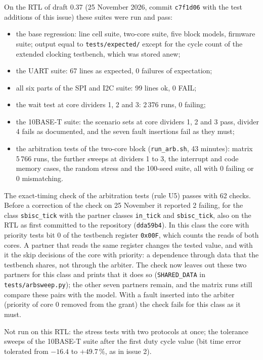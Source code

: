 \documentclass[10pt,a4paper]{article}
\begin{document}
On the RTL of draft 0.37 (25 November 2026, commit \texttt{c7f1d06} with the test additions of this issue) these
suites were run and pass:

\begin{itemize}
\item the base regression: line cell suite, two-core suite, five block models, firmware suite; output equal to
\texttt{tests/expected/} except for the cycle count of the extended clocking testbench, which was stored anew;
\item the UART suite: 67 lines as expected, 0 failures of expectation;
\item all six parts of the SPI and I2C suite: 99 lines ok, 0 FAIL;
\item the wait test at core dividers 1, 2 and 3: 2\,376 runs, 0 failing;
\item the 10BASE-T suite: the scenario sets at core dividers 1, 2 and 3 pass, divider 4 fails as documented,
and the seven fault insertions fail as they must;
\item the arbitration tests of the two-core block (\texttt{run\_arb.sh}, 43 minutes): matrix 5\,766 runs, the
further sweeps at dividers 1 to 3, the interrupt and code memory cases, the random stress and the 100-seed
suite, all with 0 failing or 0 mismatching.
\end{itemize}

The exact-timing check of the arbitration tests (rule U5) passes with 62 checks. Before a correction of the
check on 25 November it reported 2 failing, for the class \texttt{sbisc\_tick} with the partner classes
\texttt{in\_tick} and \texttt{sbisc\_tick}, also on the RTL as first committed to the repository (\texttt{dda59b4}).
In this class the core with priority tests bit 0 of the testbench register \texttt{0x00F}, which counts the
reads of both cores. A partner that reads the same register changes the tested value, and with it the skip
decisions of the core with priority: a dependence through data that the testbench shares, not through the
arbiter. The check now leaves out these two partners for this class and prints that it does so
(\texttt{SHARED\_DATA} in \texttt{tests/arbsweep.py}); the other seven partners remain, and the matrix runs still
compare these pairs with the model. With a fault inserted into the arbiter (priority of core 0 removed from
the grant) the check fails for this class as it must.

Not run on this RTL: the stress tests with two protocols at once; the tolerance sweeps of the 10BASE-T suite
after the first duty cycle value (bit time error tolerated from $-16.4$ to $+49.7\,\%$, as in issue 2).
\end{document}

